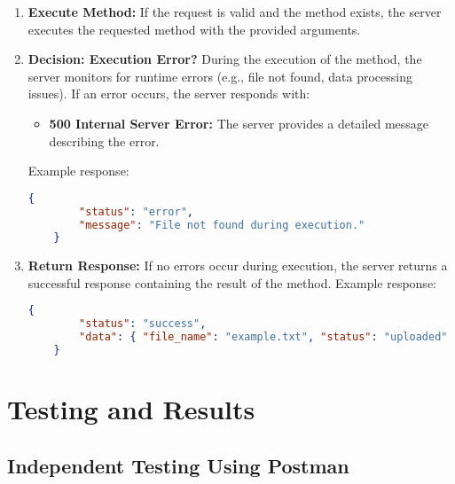 \documentclass{article}
\begin{document}
\begin{enumerate}
    \item \textbf{Execute Method:}  
    If the request is valid and the method exists, the server executes the requested method with the provided arguments.

    \item \textbf{Decision: Execution Error?}  
    During the execution of the method, the server monitors for runtime errors (e.g., file not found, data processing issues).  
    If an error occurs, the server responds with:
    \begin{itemize}
        \item \textbf{500 Internal Server Error:} The server provides a detailed message describing the error.
    \end{itemize}
    Example response:
    \begin{lstlisting}[language=JSON]
    {
        "status": "error",
        "message": "File not found during execution."
    }
    \end{lstlisting}

    \item \textbf{Return Response:}  
    If no errors occur during execution, the server returns a successful response containing the result of the method.
    Example response:
    \begin{lstlisting}[language=JSON]
    {
        "status": "success",
        "data": { "file_name": "example.txt", "status": "uploaded" }
    }
    \end{lstlisting}
\end{enumerate}

\section{Testing and Results} %

\subsection{Independent Testing Using Postman}
\end{document}

